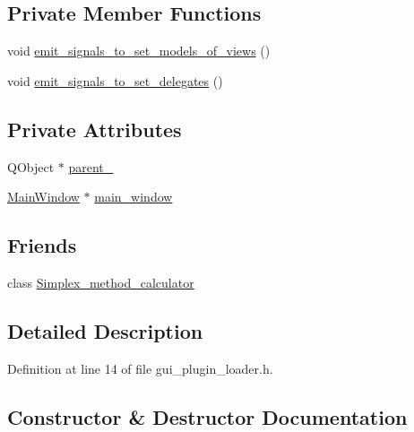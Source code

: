 \subsection*{Private Member Functions}
\begin{DoxyCompactItemize}
\item 
void \hyperlink{classgui__plugin__loader_a41f08e87c06edd90551177c9d26e20b6}{emit\+\_\+signals\+\_\+to\+\_\+set\+\_\+models\+\_\+of\+\_\+views} ()
\item 
void \hyperlink{classgui__plugin__loader_a1aa2e332cd05954fcb9bbf506450c290}{emit\+\_\+signals\+\_\+to\+\_\+set\+\_\+delegates} ()
\end{DoxyCompactItemize}
\subsection*{Private Attributes}
\begin{DoxyCompactItemize}
\item 
Q\+Object $\ast$ \hyperlink{classgui__plugin__loader_a6bf4626d341c427f2c72a8b504dd2086}{parent\+\_\+}
\item 
\hyperlink{classMainWindow}{Main\+Window} $\ast$ \hyperlink{classgui__plugin__loader_a1ff765127327eec72360c355a6255642}{main\+\_\+window}
\end{DoxyCompactItemize}
\subsection*{Friends}
\begin{DoxyCompactItemize}
\item 
class \hyperlink{classgui__plugin__loader_aa57bcac61e09f9c999a2f048dc923409}{Simplex\+\_\+method\+\_\+calculator}
\end{DoxyCompactItemize}


\subsection{Detailed Description}


Definition at line 14 of file gui\+\_\+plugin\+\_\+loader.\+h.



\subsection{Constructor \& Destructor Documentation}
\mbox{\label{classgui__plugin__loader_a06e6c9395877425822e5f178804962f3}} 
